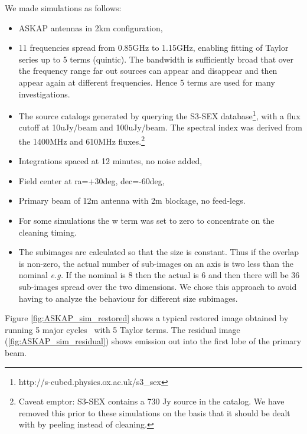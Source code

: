 \documentclass[11pt,a4paper,variablewidth]{article}
\begin{document}
We made simulations as follows:
\begin{itemize}
	\item ASKAP antennas in 2km configuration, 
	\item 11 frequencies spread from 0.85GHz to 1.15GHz, enabling fitting of  Taylor series up to 5 terms (quintic). The bandwidth is sufficiently broad that over the frequency range far out sources can appear and disappear and then appear again at different frequencies. Hence 5 terms are used for many investigations.
	\item The source catalogs generated by querying the S3-SEX database\footnote{http://s-cubed.physics.ox.ac.uk/s3\_sex}, with a flux cutoff at 10uJy/beam and 100uJy/beam. The spectral index was derived from the 1400MHz and 610MHz fluxes.\footnote{Caveat emptor: S3-SEX contains a 730 Jy source in the catalog. We have removed this prior to these simulations on the basis that it should be dealt with by peeling instead of cleaning.}
	\item Integrations spaced at 12 minutes, no noise added,
	\item Field center at ra=+30deg, dec=-60deg,
	\item Primary beam of 12m antenna with 2m blockage, no feed-legs.
	\item For some simulations the w term was set to zero to concentrate on the cleaning timing.
	\item The subimages are calculated so that the size is constant. Thus if the overlap is non-zero, the actual number of sub-images on an axis is two less than the nominal {\em e.g.} If the nominal is 8 then the actual is 6 and then there will be 36 sub-images spread over the two dimensions. We chose this approach to avoid having to  analyze the behaviour for different size subimages.
\end{itemize}

Figure \ref{fig:ASKAP_sim_restored} shows a typical restored image obtained by running 5 major cycles \MAM\ with 5 Taylor terms. The residual image (\ref{fig:ASKAP_sim_residual}) shows emission out into the first lobe of the primary beam.
\end{document}
